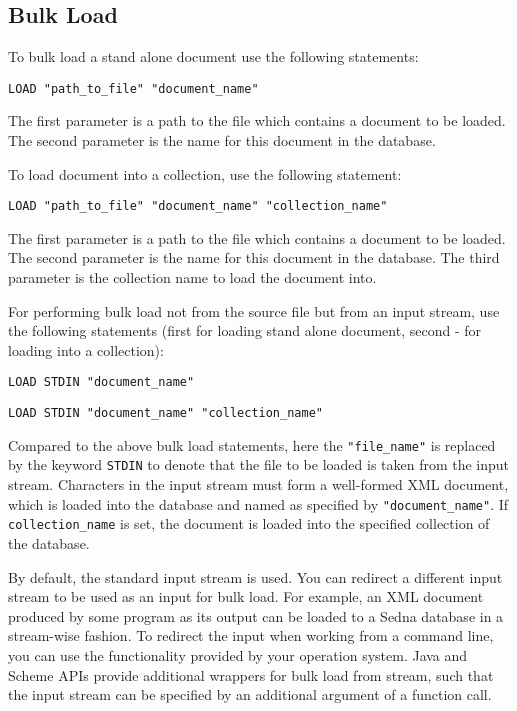 \documentclass[a4paper,12pt]{article}
\begin{document}
\subsection{Bulk Load}
\label{bulk-load}

To bulk load a stand alone document use the following statements:
\begin{verbatim}
LOAD "path_to_file" "document_name"
\end{verbatim}
The first parameter is a path to the file which contains a document to be
loaded. The second parameter is the name for this document in the database.

To load document into a collection, use the following statement: 
\begin{verbatim}
LOAD "path_to_file" "document_name" "collection_name"
\end{verbatim}
The first parameter is a path to the file which contains a document to be
loaded. The second parameter is the name for this document in the database. The
third parameter is the collection name to load the document into.

For performing bulk load not from the source file but from an input stream,
use the following statements (first for loading stand alone document, second -
for loading into a collection):
\begin{verbatim}
LOAD STDIN "document_name"
\end{verbatim}
\begin{verbatim}
LOAD STDIN "document_name" "collection_name"
\end{verbatim}

Compared to the above bulk load statements, here the \verb!"file_name"! is
replaced by the keyword \verb!STDIN! to denote that the file to be loaded is
taken from the input stream. Characters in the input stream must form a
well-formed XML document, which is loaded into the database and named as
specified by \verb!"document_name"!. If \verb!collection_name! is set, the
document is loaded into the specified collection of the database.

By default, the standard input stream is used. You can redirect a different
input stream to be used as an input for bulk load. For example, an XML document
produced by some program as its output can be loaded to a Sedna database in a
stream-wise fashion. To redirect the input when working from a command line, you
can use the functionality provided by your operation system. Java and Scheme
APIs provide additional wrappers for bulk load from stream, such that the input
stream can be specified by an additional argument of a function call.
\end{document}
